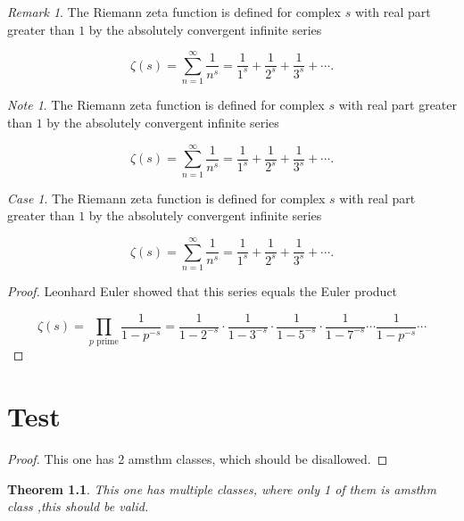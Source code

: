 \documentclass[english,oneside, article]{memoir}
\theoremstyle{plain}
\newtheorem{Theorem}{Theorem}[chapter]
\theoremstyle{definition}
\theoremstyle{remark}
\newtheorem{Case}{Case}[chapter]
\newtheorem*{Remark}{Remark}
\newtheorem*{Note}{Note}
\begin{document}
\begin{Remark}

The Riemann zeta function is defined for complex \(s\) with real part
greater than \(1\) by the absolutely convergent infinite series

\[\zeta(s) = \sum_{n=1}^\infty \frac{1}{n^s} = \frac{1}{1^s} + \frac{1}{2^s} + \frac{1}{3^s} + \cdots.\]

\end{Remark}

\begin{Note}

The Riemann zeta function is defined for complex \(s\) with real part
greater than \(1\) by the absolutely convergent infinite series

\[\zeta(s) = \sum_{n=1}^\infty \frac{1}{n^s} = \frac{1}{1^s} + \frac{1}{2^s} + \frac{1}{3^s} + \cdots.\]

\end{Note}

\begin{Case}

The Riemann zeta function is defined for complex \(s\) with real part
greater than \(1\) by the absolutely convergent infinite series

\[\zeta(s) = \sum_{n=1}^\infty \frac{1}{n^s} = \frac{1}{1^s} + \frac{1}{2^s} + \frac{1}{3^s} + \cdots.\]

\end{Case}

\begin{proof}

Leonhard Euler showed that this series equals the Euler product

\[\zeta(s) = \prod_{p \text{ prime}} \frac{1}{1-p^{-s}}= \frac{1}{1-2^{-s}}\cdot\frac{1}{1-3^{-s}}\cdot\frac{1}{1-5^{-s}}\cdot\frac{1}{1-7^{-s}} \cdots \frac{1}{1-p^{-s}} \cdots\]

\end{proof}

\chapter{Test}\label{test}

\begin{proof}

This one has 2 amsthm classes, which should be disallowed.

\end{proof}

\begin{Theorem}

This one has multiple classes, where only 1 of them is amsthm class
,this should be valid.

\end{Theorem}
\end{document}
